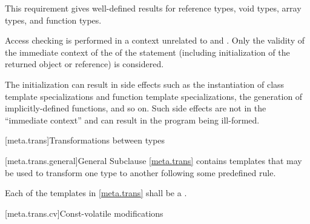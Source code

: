 \begin{note}
This requirement gives well-defined results for reference types, void
types, array types, and function types.
\end{note}
Access checking is performed
in a context unrelated to  and . Only the validity of
the immediate context of the  of the  statement
(including initialization of the returned object or reference) is considered.
\begin{note}
The
initialization can result in side effects such as the
instantiation of class template specializations and function template
specializations, the generation of implicitly-defined functions, and so on. Such
side effects are not in the ``immediate context'' and can result in the program
being ill-formed.
\end{note}

[meta.trans]{Transformations between types}

[meta.trans.general]{General}
\pnum
Subclause \ref{meta.trans} contains templates that may be used to transform one
type to another following some predefined rule.

\pnum
Each of the templates in \ref{meta.trans} shall be a
.

[meta.trans.cv]{Const-volatile modifications}

